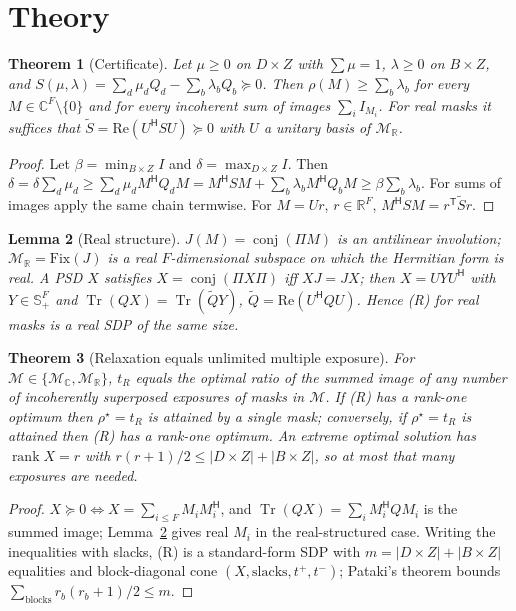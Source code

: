 \documentclass[11pt,a4paper]{article}
\newtheorem{theorem}{Theorem}\newtheorem{lemma}[theorem]{Lemma}\newtheorem{proposition}[theorem]{Proposition}
\newcommand{\R}{\mathbb{R}}\newcommand{\C}{\mathbb{C}}\newcommand{\PSD}{\succeq 0}
\DeclareMathOperator{\Tr}{Tr}\DeclareMathOperator{\rank}{rank}\DeclareMathOperator{\conj}{conj}
\newcommand{\I}{I}\newcommand{\rhostar}{\rho^{\star}}
\begin{document}
\section{Theory}\label{sec:theory}
\begin{theorem}[Certificate]\label{thm:cert}
Let $\mu\ge0$ on $D\times Z$ with $\sum\mu=1$, $\lambda\ge0$ on $B\times Z$, and $S(\mu,\lambda)=\sum_d\mu_dQ_d-\sum_b\lambda_bQ_b\PSD$. Then $\rho(M)\ge\sum_b\lambda_b$ for every $M\in\C^F\setminus\{0\}$ and for every incoherent sum of images $\sum_i\I_{M_i}$. For real masks it suffices that $\tilde S=\mathrm{Re}(U^{\mathsf H}SU)\PSD$ with $U$ a unitary basis of $\mathcal M_\R$.
\end{theorem}
\begin{proof}
Let $\beta=\min_{B\times Z}\I$ and $\delta=\max_{D\times Z}\I$. Then $\delta=\delta\sum_d\mu_d\ge\sum_d\mu_dM^{\mathsf H}Q_dM=M^{\mathsf H}SM+\sum_b\lambda_bM^{\mathsf H}Q_bM\ge\beta\sum_b\lambda_b$. For sums of images apply the same chain termwise. For $M=Ur$, $r\in\R^F$, $M^{\mathsf H}SM=r^{\mathsf T}\tilde Sr$.
\end{proof}
\begin{lemma}[Real structure]\label{lem:real}
$J(M)=\conj(\Pi M)$ is an antilinear involution; $\mathcal M_\R=\mathrm{Fix}(J)$ is a real $F$-dimensional subspace on which the Hermitian form is real. A PSD $X$ satisfies $X=\conj(\Pi X\Pi)$ iff $XJ=JX$; then $X=UYU^{\mathsf H}$ with $Y\in\mathbb S^F_+$ and $\Tr(QX)=\Tr(\tilde QY)$, $\tilde Q=\mathrm{Re}(U^{\mathsf H}QU)$. Hence (R) for real masks is a real SDP of the same size.
\end{lemma}
\begin{theorem}[Relaxation equals unlimited multiple exposure]\label{thm:me}
For $\mathcal M\in\{\mathcal M_\C,\mathcal M_\R\}$, $t_R$ equals the optimal ratio of the summed image of any number of incoherently superposed exposures of masks in $\mathcal M$. If (R) has a rank-one optimum then $\rhostar=t_R$ is attained by a single mask; conversely, if $\rhostar=t_R$ is attained then (R) has a rank-one optimum. An extreme optimal solution has $\rank X=r$ with $r(r+1)/2\le|D\times Z|+|B\times Z|$, so at most that many exposures are needed.
\end{theorem}
\begin{proof}
$X\PSD\iff X=\sum_{i\le F}M_iM_i^{\mathsf H}$, and $\Tr(QX)=\sum_i M_i^{\mathsf H}QM_i$ is the summed image; Lemma~\ref{lem:real} gives real $M_i$ in the real-structured case. Writing the inequalities with slacks, (R) is a standard-form SDP with $m=|D\times Z|+|B\times Z|$ equalities and block-diagonal cone $(X,\text{slacks},t^+,t^-)$; Pataki's theorem \cite{pataki1998} bounds $\sum_{\text{blocks}}r_b(r_b+1)/2\le m$.
\end{proof}
\end{document}
